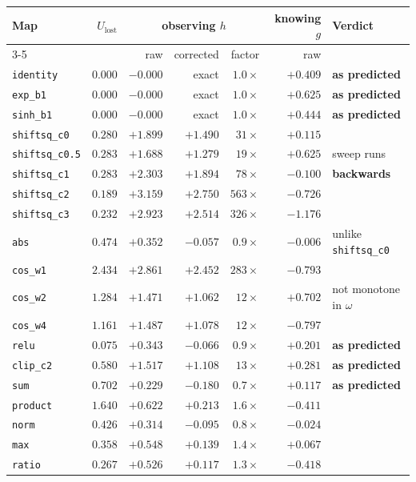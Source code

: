 \documentclass[11pt]{article}
\newcommand{\Ulost}{U_{\text{lost}}}
\begin{document}
\begin{center}
\small
\begin{tabular}{lrrrrrl}
\toprule
Map & $\Ulost$ & \multicolumn{3}{c}{observing $h$} & knowing $g$ & Verdict \\
\cmidrule(lr){3-5}
 & & raw & corrected & factor & raw & \\
\midrule
\texttt{identity}      & $0.000$ & $-0.000$ & exact    & $1.0\times$   & $+0.409$ & \textbf{as predicted} \\
\texttt{exp\_b1}       & $0.000$ & $-0.000$ & exact    & $1.0\times$   & $+0.625$ & \textbf{as predicted} \\
\texttt{sinh\_b1}      & $0.000$ & $-0.000$ & exact    & $1.0\times$   & $+0.444$ & \textbf{as predicted} \\
\midrule
\texttt{shiftsq\_c0}   & $0.280$ & $+1.899$ & $+1.490$ & $31\times$    & $+0.115$ & \\
\texttt{shiftsq\_c0.5} & $0.283$ & $+1.688$ & $+1.279$ & $19\times$    & $+0.625$ & sweep runs \\
\texttt{shiftsq\_c1}   & $0.283$ & $+2.303$ & $+1.894$ & $78\times$    & $-0.100$ & \textbf{backwards} \\
\texttt{shiftsq\_c2}   & $0.189$ & $+3.159$ & $+2.750$ & $563\times$   & $-0.726$ & \\
\texttt{shiftsq\_c3}   & $0.232$ & $+2.923$ & $+2.514$ & $326\times$   & $-1.176$ & \\
\midrule
\texttt{abs}           & $0.474$ & $+0.352$ & $-0.057$ & $0.9\times$   & $-0.006$ & unlike \texttt{shiftsq\_c0} \\
\texttt{cos\_w1}       & $2.434$ & $+2.861$ & $+2.452$ & $283\times$   & $-0.793$ & \\
\texttt{cos\_w2}       & $1.284$ & $+1.471$ & $+1.062$ & $12\times$    & $+0.702$ & not monotone in $\omega$ \\
\texttt{cos\_w4}       & $1.161$ & $+1.487$ & $+1.078$ & $12\times$    & $-0.797$ & \\
\texttt{relu}          & $0.075$ & $+0.343$ & $-0.066$ & $0.9\times$   & $+0.201$ & \textbf{as predicted} \\
\texttt{clip\_c2}      & $0.580$ & $+1.517$ & $+1.108$ & $13\times$    & $+0.281$ & \textbf{as predicted} \\
\midrule
\texttt{sum}           & $0.702$ & $+0.229$ & $-0.180$ & $0.7\times$   & $+0.117$ & \textbf{as predicted} \\
\texttt{product}       & $1.640$ & $+0.622$ & $+0.213$ & $1.6\times$   & $-0.411$ & \\
\texttt{norm}          & $0.426$ & $+0.314$ & $-0.095$ & $0.8\times$   & $-0.024$ & \\
\texttt{max}           & $0.358$ & $+0.548$ & $+0.139$ & $1.4\times$   & $+0.067$ & \\
\texttt{ratio}         & $0.267$ & $+0.526$ & $+0.117$ & $1.3\times$   & $-0.418$ & \\
\bottomrule
\end{tabular}
\end{center}
\end{document}
